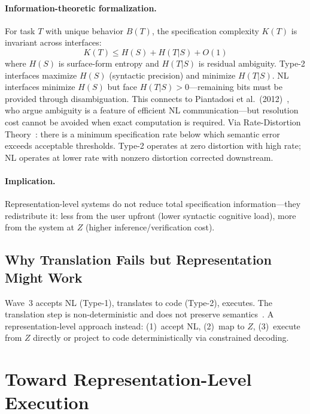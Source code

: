 \documentclass[11pt]{article}
\theoremstyle{definition}
\begin{document}
\paragraph{Information-theoretic formalization.}
For task $T$ with unique behavior $B(T)$, the specification complexity $K(T)$ is invariant across interfaces:
\begin{equation}\label{eq:conservation}
K(T) \leq H(S) + H(T|S) + O(1)
\end{equation}
where $H(S)$ is surface-form entropy and $H(T|S)$ is residual ambiguity. Type-2 interfaces maximize $H(S)$ (syntactic precision) and minimize $H(T|S)$. NL interfaces minimize $H(S)$ but face $H(T|S) > 0$---remaining bits must be provided through disambiguation. This connects to Piantadosi et al.\ (2012)~\cite{piantadosi2012ambiguity}, who argue ambiguity is a feature of efficient NL communication---but resolution cost cannot be avoided when exact computation is required. Via Rate-Distortion Theory~\cite{shannon1959coding}: there is a minimum specification rate below which semantic error exceeds acceptable thresholds. Type-2 operates at zero distortion with high rate; NL operates at lower rate with nonzero distortion corrected downstream.

\paragraph{Implication.}
Representation-level systems do not reduce total specification information---they redistribute it: less from the user upfront (lower syntactic cognitive load), more from the system at $Z$ (higher inference/verification cost).

\subsection{Why Translation Fails but Representation Might Work}

Wave~3 accepts NL (Type-1), translates to code (Type-2), executes. The translation step is non-deterministic and does not preserve semantics~\cite{cheung2025translation}. A representation-level approach instead: (1)~accept NL, (2)~map to $Z$, (3)~execute from $Z$ directly or project to code deterministically via constrained decoding.


\section{Toward Representation-Level Execution}\label{sec:toward}
\end{document}
